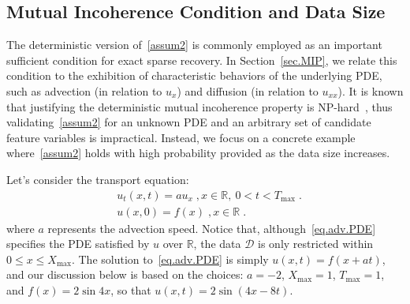 \documentclass[a4paper,11pt]{article}
\theoremstyle{definition}
\begin{document}
\subsection{Mutual Incoherence Condition and Data Size}
The deterministic version of~\eqref{assum2} is commonly employed as an important sufficient condition for exact sparse recovery. In Section~\ref{sec.MIP}, we relate this condition to the exhibition of characteristic behaviors of the underlying PDE, such as advection (in relation to $u_x$) and diffusion (in relation to $u_{xx}$). It is known that justifying the deterministic mutual incoherence property is NP-hard~\cite{tillmann2013computational}, thus validating~\eqref{assum2} for an unknown PDE and an arbitrary set of candidate feature variables is  impractical. Instead, we focus on a  concrete example where~\eqref{assum2} holds with high probability provided as the data size increases.

Let's consider the transport equation:
\begin{align}
&u_t(x,t) = au_x\;,x\in\mathbb{R},~0<t<T_{\max}\;.\label{eq.adv.PDE}\\
&u(x,0)=f(x)\;, x\in\mathbb{R}\;.\nonumber %
\end{align}
where $a$ represents the advection speed. Notice that, although~\eqref{eq.adv.PDE} specifies the PDE satisfied by $u$ over $\mathbb{R}$, the data $\mathcal{D}$ is only restricted within $0\leq x\leq X_{\max}$.  The solution to~\eqref{eq.adv.PDE} is simply $u(x,t)=f(x+at)$, and our discussion below is based on the choices: $a=-2$, $X_{\max}=1$, $T_{\max}=1$, and $f(x)=2\sin 4x$, so that $u(x,t)=2\sin(4x-8t)$.

\end{document}
